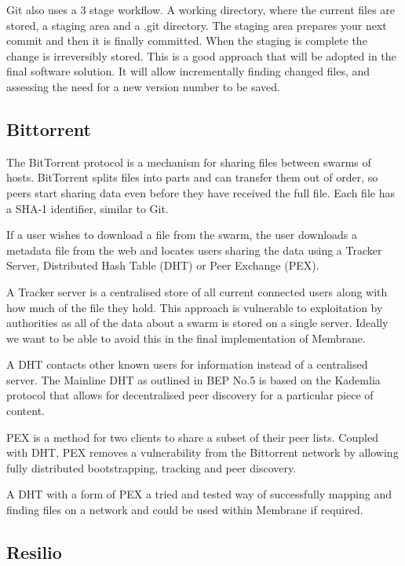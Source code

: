 \documentclass[11pt, a4paper, twoside]{report}
\begin{document}
Git also uses a 3 stage workflow. A working directory, where the current files are stored, a staging area and a .git directory. The staging area prepares your next commit and then it is finally committed. When the staging is complete the change is irreversibly stored. This is a good approach that will be adopted in the final software solution. It will allow incrementally finding changed files, and assessing the need for a new version number to be saved.

\subsection{Bittorrent}

The BitTorrent protocol is a mechanism for sharing files between swarms of hosts. BitTorrent splits files into parts and can transfer them out of order, so peers start sharing data even before they have received the full file. Each file has a SHA-1 identifier, similar to Git. \citep{qiu2004modeling}

If a user wishes to download a file from the swarm, the user downloads a metadata file from the web and locates users sharing the data using a Tracker Server, Distributed Hash Table (DHT) or Peer Exchange (PEX). \citep{cohen2008bittorrent}

A Tracker server is a centralised store of all current connected users along with how much of the file they hold. This approach is vulnerable to exploitation by authorities as all of the data about a swarm is stored on a single server. Ideally we want to be able to avoid this in the final implementation of Membrane.

A DHT contacts other known users for information instead of a centralised server. The Mainline DHT as outlined in BEP No.5 is based on the Kademlia protocol that allows for decentralised peer discovery for a particular piece of content.

PEX is a method for two clients to share a subset of their peer lists. Coupled with DHT, PEX removes a vulnerability from the Bittorrent network by allowing fully distributed bootstrapping, tracking and peer discovery.

A DHT with a form of PEX a tried and tested way of successfully mapping and finding files on a network and could be used within Membrane if required.

\subsection{Resilio}
\end{document}
